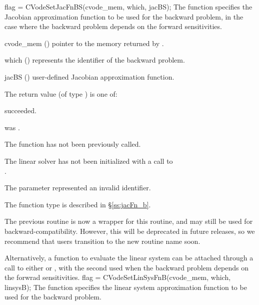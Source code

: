 {
  flag = CVodeSetJacFnBS(cvode\_mem, which, jacBS);
}
{
  The function  specifies the Jacobian
  approximation function to be used for the backward problem, in the
  case where the backward problem depends on the forward sensitivities.
}
{
  \begin{args}
  \item[cvode\_mem] ()
    pointer to the {\cvodes} memory returned by .
  \item[which] ()
    represents the identifier of the backward problem.
  \item[jacBS] ()
    user-defined Jacobian approximation function.
  \end{args}
}
{
  The return value  (of type ) is one of:
  \begin{args}
  \item[\Id{CVLS\_SUCCESS}]
     succeeded.
  \item[\Id{CVLS\_MEM\_NULL}]
     was .
  \item[\Id{CVLS\_NO\_ADJ}]
    The function  has not been previously called.
  \item[\Id{CVLS\_LMEM\_NULL}]
    The linear solver has not been initialized with a call to \\ \noindent
    .
  \item[\Id{CVLS\_ILL\_INPUT}]
    The parameter  represented an invalid identifier.
  \end{args}
}
{
  The function type  is described in \S\ref{ss:jacFn_b}.

  The previous routine  is now a wrapper for this
  routine, and may still be used for backward-compatibility.  However,
  this will be deprecated in future releases, so we recommend that
  users transition to the new routine name soon.
}
Alternatively, a function to evaluate the linear system can be attached
through a call to either  or , with
the second used when the backward problem depends on the forwrad sensitivities.
{
  flag = CVodeSetLinSysFnB(cvode\_mem, which, linsysB);
}
{
  The function  specifies the linear system
  approximation function to be used for the backward problem.
}
